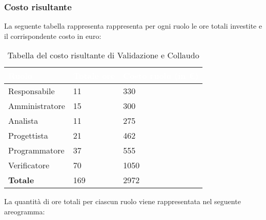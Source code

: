 \subsubsection{Costo risultante}
La seguente tabella rappresenta rappresenta per ogni ruolo le ore totali investite e il corrispondente costo in euro:
{
\renewcommand{\arraystretch}{2}
\begin{longtable}{ C{3cm} C{2cm} C{4cm}}
\caption{Tabella del costo risultante di Validazione e Collaudo}\\

\textcolor{white}{\textbf{Ruolo}} & 
\textcolor{white}{\textbf{Totale ore}} & 
\textcolor{white}{\textbf{Costo ruolo (in \euro{})}}\\	
\endhead
        
Responsabile    &  11 &  330 \\
Amministratore  &  15 &  300 \\
Analista        &  11 &  275 \\
Progettista     &  21 &  462 \\
Programmatore   &  37 &  555 \\
Verificatore    &  70 & 1050 \\
\textbf{Totale} & 169 & 2972 \\
	
\end{longtable}
}

\vskip 30pt %
La quantità di ore totali per ciascun ruolo viene rappresentata nel seguente areogramma:
\begin{center}
\end{center}
